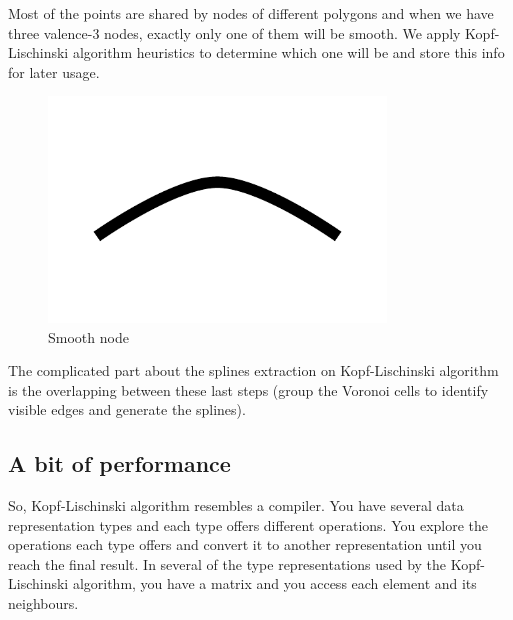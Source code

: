 Most of the points are shared by nodes of different polygons and when we have
three valence-3 nodes, exactly only one of them will be smooth. We apply
Kopf-Lischinski algorithm heuristics to determine which one will be and store
this info for later usage.

\begin{figure}[H]
  \centering
  \includegraphics[width=0.8\textwidth]{assets/smooth.pdf}
  \caption{Smooth node}
\end{figure}

The complicated part about the splines extraction on Kopf-Lischinski algorithm
is the overlapping between these last steps (group the Voronoi cells to identify
visible edges and generate the splines).

\subsection{A bit of performance}

So, Kopf-Lischinski algorithm resembles a compiler. You have several data
representation types and each type offers different operations. You explore the
operations each type offers and convert it to another representation until you
reach the final result. In several of the type representations used by the
Kopf-Lischinski algorithm, you have a matrix and you access each element and its
neighbours.

